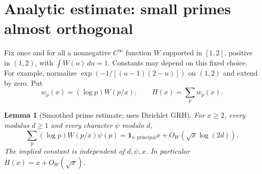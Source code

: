\documentclass[11pt]{article}
\newtheorem{lemma}[theorem]{Lemma}
\theoremstyle{remark}\newtheorem{remark}[theorem]{Remark}
\newcommand{\one}{\mathbf 1}
\begin{document}
\section{Analytic estimate: small primes almost orthogonal}\label{sec:analytic}
Fix once and for all a nonnegative $C^\infty$ function $W$ supported in $[1,2]$, positive in $(1,2)$, with $\int W(u)\,du=1$. Constants may depend on this fixed choice. For example, normalize $\exp(-1/[(u-1)(2-u)])$ on $(1,2)$ and extend by zero. Put
\[
 w_p(x)=(\log p)W(p/x),\qquad H(x)=\sum_p w_p(x).
\]
\begin{lemma}[Smoothed prime estimate; uses Dirichlet GRH]\label{lem:explicit}
For $x\ge2$, every modulus $d\ge1$ and every character $\psi$ modulo $d$,
\begin{equation}\label{eq:prime}
 \sum_p (\log p)W(p/x)\psi(p)
 =\one_{\psi\text{ principal}}x+O_W(\sqrt x\log(2d)).
\end{equation}
The implied constant is independent of $d,\psi,x$. In particular $H(x)=x+O_W(\sqrt x)$.
\end{lemma}
\end{document}
